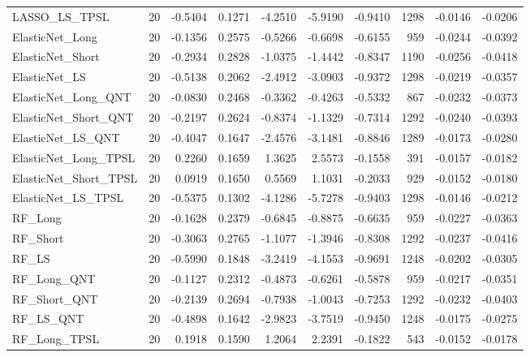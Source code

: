 \begin{tabular}{llrrrrrrrr}
\cline{1-10}
LASSO\_LS\_TPSL & 20 & -0.5404 & 0.1271 & -4.2510 & -5.9190 & -0.9410 & 1298 & -0.0146 & -0.0206 \\
\cline{1-10}
ElasticNet\_Long & 20 & -0.1356 & 0.2575 & -0.5266 & -0.6698 & -0.6155 & 959 & -0.0244 & -0.0392 \\
\cline{1-10}
ElasticNet\_Short & 20 & -0.2934 & 0.2828 & -1.0375 & -1.4442 & -0.8347 & 1190 & -0.0256 & -0.0418 \\
\cline{1-10}
ElasticNet\_LS & 20 & -0.5138 & 0.2062 & -2.4912 & -3.0903 & -0.9372 & 1298 & -0.0219 & -0.0357 \\
\cline{1-10}
ElasticNet\_Long\_QNT & 20 & -0.0830 & 0.2468 & -0.3362 & -0.4263 & -0.5332 & 867 & -0.0232 & -0.0373 \\
\cline{1-10}
ElasticNet\_Short\_QNT & 20 & -0.2197 & 0.2624 & -0.8374 & -1.1329 & -0.7314 & 1292 & -0.0240 & -0.0393 \\
\cline{1-10}
ElasticNet\_LS\_QNT & 20 & -0.4047 & 0.1647 & -2.4576 & -3.1481 & -0.8846 & 1289 & -0.0173 & -0.0280 \\
\cline{1-10}
ElasticNet\_Long\_TPSL & 20 & 0.2260 & 0.1659 & 1.3625 & 2.5573 & -0.1558 & 391 & -0.0157 & -0.0182 \\
\cline{1-10}
ElasticNet\_Short\_TPSL & 20 & 0.0919 & 0.1650 & 0.5569 & 1.1031 & -0.2033 & 929 & -0.0152 & -0.0180 \\
\cline{1-10}
ElasticNet\_LS\_TPSL & 20 & -0.5375 & 0.1302 & -4.1286 & -5.7278 & -0.9403 & 1298 & -0.0146 & -0.0212 \\
\cline{1-10}
RF\_Long & 20 & -0.1628 & 0.2379 & -0.6845 & -0.8875 & -0.6635 & 959 & -0.0227 & -0.0363 \\
\cline{1-10}
RF\_Short & 20 & -0.3063 & 0.2765 & -1.1077 & -1.3946 & -0.8308 & 1292 & -0.0237 & -0.0416 \\
\cline{1-10}
RF\_LS & 20 & -0.5990 & 0.1848 & -3.2419 & -4.1553 & -0.9691 & 1248 & -0.0202 & -0.0305 \\
\cline{1-10}
RF\_Long\_QNT & 20 & -0.1127 & 0.2312 & -0.4873 & -0.6261 & -0.5878 & 959 & -0.0217 & -0.0351 \\
\cline{1-10}
RF\_Short\_QNT & 20 & -0.2139 & 0.2694 & -0.7938 & -1.0043 & -0.7253 & 1292 & -0.0232 & -0.0403 \\
\cline{1-10}
RF\_LS\_QNT & 20 & -0.4898 & 0.1642 & -2.9823 & -3.7519 & -0.9450 & 1248 & -0.0175 & -0.0275 \\
\cline{1-10}
RF\_Long\_TPSL & 20 & 0.1918 & 0.1590 & 1.2064 & 2.2391 & -0.1822 & 543 & -0.0152 & -0.0178 \\
\cline{1-10}

\end{tabular}
